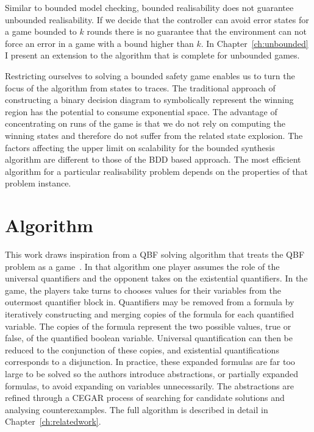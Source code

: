 Similar to bounded model checking, bounded realisability does not guarantee unbounded realisability.  If we decide that the controller can avoid error states for a game bounded to $k$ rounds there is no guarantee that the environment can not force an error in a game with a bound higher than $k$. In Chapter~\ref{ch:unbounded} I present an extension to the algorithm that is complete for unbounded games.

Restricting ourselves to solving a bounded safety game enables us to turn the focus of the algorithm from states to traces. The traditional approach of constructing a binary decision diagram to symbolically represent the winning region has the potential to consume exponential space. The advantage of concentrating on runs of the game is that we do not rely on computing the winning states and therefore do not suffer from the related state explosion. The factors affecting the upper limit on scalability for the bounded synthesis algorithm are different to those of the BDD based approach. The most efficient algorithm for a particular realisability problem depends on the properties of that problem instance.

\section{Algorithm}

This work draws inspiration from a QBF solving algorithm that treats the QBF problem as a game~\cite{Janota12}. In that algorithm one player assumes the role of the universal quantifiers and the opponent takes on the existential quantifiers. In the game, the players take turns to chooses values for their variables from the outermost quantifier block in. Quantifiers may be removed from a formula by iteratively constructing and merging copies of the formula for each quantified variable. The copies of the formula represent the two possible values, true or false, of the quantified boolean variable. Universal quantification can then be reduced to the conjunction of these copies, and existential quantifications corresponds to a disjunction. In practice, these expanded formulas are far too large to be solved so the authors introduce abstractions, or partially expanded formulas, to avoid expanding on variables unnecessarily. The abstractions are refined through a CEGAR process of searching for candidate solutions and analysing counterexamples. The full algorithm is described in detail in Chapter~\ref{ch:relatedwork}. 

